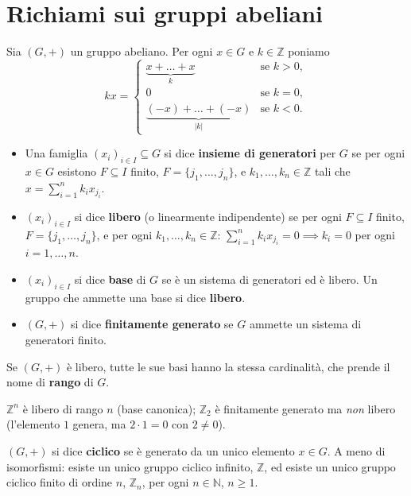\section{Richiami sui gruppi abeliani}

Sia $(G, +)$ un gruppo abeliano. Per ogni $x \in G$ e $k \in \mathbb{Z}$ poniamo
\[
kx = \begin{cases} \underbrace{x + \dots + x}_{k} & \text{se } k > 0, \\ 0 & \text{se } k = 0, \\ \underbrace{(-x) + \dots + (-x)}_{|k|} & \text{se } k < 0. \end{cases}
\]

\begin{definicion}
\begin{itemize}
    \item Una famiglia $(x_i)_{i \in I} \subseteq G$ si dice \textbf{insieme di generatori} per $G$ se per ogni $x \in G$ esistono $F \subseteq I$ finito, $F = \{j_1, \dots, j_n\}$, e $k_1, \dots, k_n \in \mathbb{Z}$ tali che $x = \sum_{i=1}^n k_i x_{j_i}$.
    \item $(x_i)_{i \in I}$ si dice \textbf{libero} (o linearmente indipendente) se per ogni $F \subseteq I$ finito, $F = \{j_1, \dots, j_n\}$, e per ogni $k_1, \dots, k_n \in \mathbb{Z}$: $\sum_{i=1}^n k_i x_{j_i} = 0 \implies k_i = 0$ per ogni $i = 1, \dots, n$.
    \item $(x_i)_{i \in I}$ si dice \textbf{base} di $G$ se \`e un sistema di generatori ed \`e libero. Un gruppo che ammette una base si dice \textbf{libero}.
    \item $(G, +)$ si dice \textbf{finitamente generato} se $G$ ammette un sistema di generatori finito.
\end{itemize}
Se $(G, +)$ \`e libero, tutte le sue basi hanno la stessa cardinalit\`a, che prende il nome di \textbf{rango} di $G$.
\end{definicion}

\begin{ejemplo}
$\mathbb{Z}^n$ \`e libero di rango $n$ (base canonica); $\mathbb{Z}_2$ \`e finitamente generato ma \emph{non} libero (l'elemento $1$ genera, ma $2 \cdot 1 = 0$ con $2 \neq 0$).
\end{ejemplo}

\begin{definicion}
$(G, +)$ si dice \textbf{ciclico} se \`e generato da un unico elemento $x \in G$. A meno di isomorfismi: esiste un unico gruppo ciclico infinito, $\mathbb{Z}$, ed esiste un unico gruppo ciclico finito di ordine $n$, $\mathbb{Z}_n$, per ogni $n \in \mathbb{N}$, $n \geqslant 1$.
\end{definicion}

